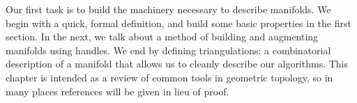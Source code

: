 Our first task is to build the machinery necessary to describe manifolds.
We begin with a quick, formal definition, and build some basic properties in the first section.
In the next, we talk about a method of building and augmenting manifolds using handles.
We end by defining triangulations: a combinatorial description of a manifold that allows us to cleanly describe our algorithms.
This chapter is intended as a review of common tools in geometric topology, so in many places references will be given in lieu of proof.